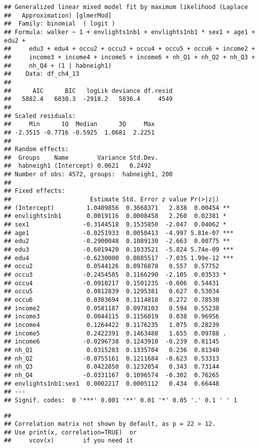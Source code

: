 \documentclass[
]{book}
\begin{document}
\begin{verbatim}
## Generalized linear mixed model fit by maximum likelihood (Laplace
##   Approximation) [glmerMod]
##  Family: binomial  ( logit )
## Formula: walker ~ 1 + envlights1nb1 + envlights1nb1 * sex1 + age1 + edu2 +  
##     edu3 + edu4 + occu2 + occu3 + occu4 + occu5 + occu6 + income2 +  
##     income3 + income4 + income5 + income6 + nh_Q1 + nh_Q2 + nh_Q3 +  
##     nh_Q4 + (1 | habneigh1)
##    Data: df_ch4_13
## 
##      AIC      BIC   logLik deviance df.resid 
##   5882.4   6030.3  -2918.2   5836.4     4549 
## 
## Scaled residuals: 
##     Min      1Q  Median      3Q     Max 
## -2.3515 -0.7716 -0.5925  1.0681  2.2251 
## 
## Random effects:
##  Groups    Name        Variance Std.Dev.
##  habneigh1 (Intercept) 0.0621   0.2492  
## Number of obs: 4572, groups:  habneigh1, 200
## 
## Fixed effects:
##                      Estimate Std. Error z value Pr(>|z|)    
## (Intercept)         1.0409856  0.3668371   2.838  0.00454 ** 
## envlights1nb1       0.0019116  0.0008458   2.260  0.02381 *  
## sex1               -0.3144518  0.1535850  -2.047  0.04062 *  
## age1               -0.0251933  0.0050413  -4.997 5.81e-07 ***
## edu2               -0.2900048  0.1089130  -2.663  0.00775 ** 
## edu3               -0.6019420  0.1033521  -5.824 5.74e-09 ***
## edu4               -0.6230000  0.0885517  -7.035 1.99e-12 ***
## occu2               0.0544126  0.0976878   0.557  0.57752    
## occu3              -0.2454505  0.1166290  -2.105  0.03533 *  
## occu4              -0.0910217  0.1501235  -0.606  0.54431    
## occu5               0.0812839  0.1295381   0.627  0.53034    
## occu6               0.0303694  0.1114818   0.272  0.78530    
## income2             0.0581187  0.0978103   0.594  0.55238    
## income3             0.0044115  0.1156019   0.038  0.96956    
## income4             0.1264422  0.1176235   1.075  0.28239    
## income5             0.2422391  0.1463488   1.655  0.09788 .  
## income6            -0.0296738  0.1243910  -0.239  0.81145    
## nh_Q1               0.0315283  0.1335704   0.236  0.81340    
## nh_Q2              -0.0755161  0.1211684  -0.623  0.53313    
## nh_Q3               0.0422850  0.1232054   0.343  0.73144    
## nh_Q4              -0.0331167  0.1096574  -0.302  0.76265    
## envlights1nb1:sex1  0.0002217  0.0005112   0.434  0.66448    
## ---
## Signif. codes:  0 '***' 0.001 '**' 0.01 '*' 0.05 '.' 0.1 ' ' 1
\end{verbatim}

\begin{verbatim}
## 
## Correlation matrix not shown by default, as p = 22 > 12.
## Use print(x, correlation=TRUE)  or
##     vcov(x)        if you need it
\end{verbatim}
\end{document}
